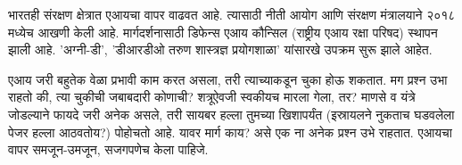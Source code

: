 भारतही संरक्षण क्षेत्रात एआयचा वापर वाढवत आहे. त्यासाठी नीती आयोग आणि संरक्षण मंत्रालयाने २०१८ मध्येच आखणी केली आहे. मार्गदर्शनासाठी डिफेन्स एआय कौन्सिल (राष्ट्रीय एआय रक्षा परिषद) स्थापन झाली आहे. 'अग्नी-डी', 'डीआरडीओ तरुण शास्त्रज्ञ प्रयोगशाळा' यांसारखे उपक्रम सुरू झाले आहेत.

एआय जरी बहुतेक वेळा प्रभावी काम करत असला, तरी त्याच्याकडून चुका होऊ शकतात. मग प्रश्न उभा राहतो की, त्या चुकीची जबाबदारी कोणाची? शत्रूऐवजी स्वकीयच मारला गेला, तर? माणसे व यंत्रे जोडल्याने फायदे जरी अनेक असले, तरी सायबर हल्ला तुमच्या खिशापर्यंत (इस्रायलने नुकताच घडवलेला पेजर हल्ला आठवतोय?) पोहोचतो आहे. यावर मार्ग काय? असे एक ना अनेक प्रश्न उभे राहतात. एआयचा वापर समजून-उमजून, सजगपणेच केला पाहिजे.